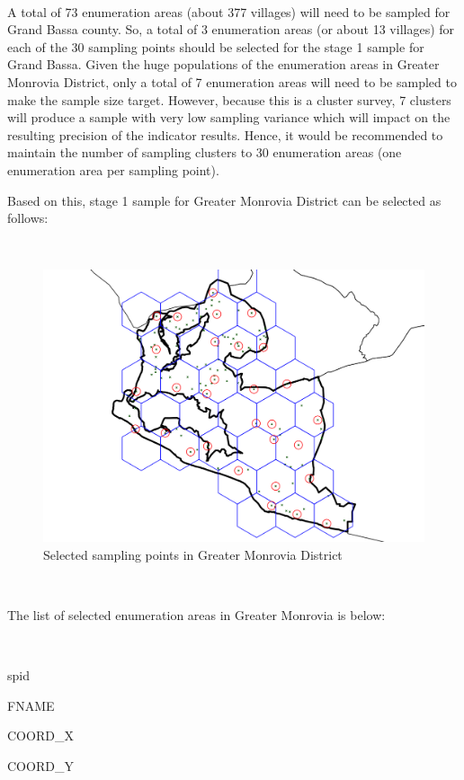 \documentclass[12pt,a4paper]{book}
\theoremstyle{definition}
\theoremstyle{definition}
\theoremstyle{definition}
\theoremstyle{remark}
\begin{document}
~

A total of 73 enumeration areas (about 377 villages) will need to be
sampled for Grand Bassa county. So, a total of 3 enumeration areas (or
about 13 villages) for each of the 30 sampling points should be selected
for the stage 1 sample for Grand Bassa. Given the huge populations of
the enumeration areas in Greater Monrovia District, only a total of 7
enumeration areas will need to be sampled to make the sample size
target. However, because this is a cluster survey, 7 clusters will
produce a sample with very low sampling variance which will impact on
the resulting precision of the indicator results. Hence, it would be
recommended to maintain the number of sampling clusters to 30
enumeration areas (one enumeration area per sampling point).

Based on this, stage 1 sample for Greater Monrovia District can be
selected as follows:

~

\begin{figure}[H]

\includegraphics{figures/sample24-1} \hfill{}

\caption{Selected sampling points in Greater Monrovia District}\label{fig:sample24}
\end{figure}

~

The list of selected enumeration areas in Greater Monrovia is below:

~

spid

FNAME

COORD\_X

COORD\_Y
\end{document}
